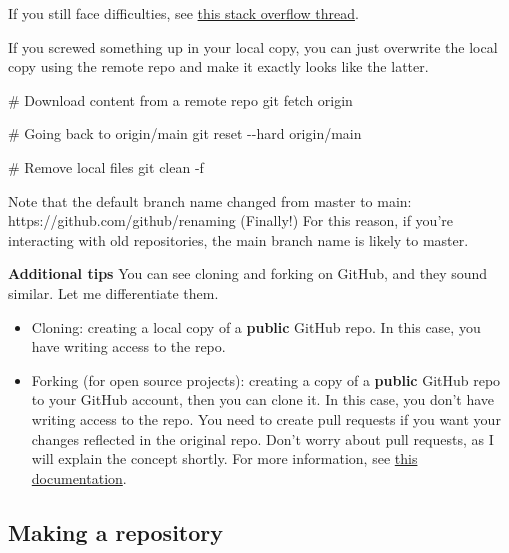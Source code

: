 \documentclass[
  letterpaper,
  DIV=11,
  numbers=noendperiod]{scrreprt}
\newenvironment{Shaded}{\begin{snugshade}}{\end{snugshade}}
\newcommand{\AttributeTok}[1]{\textcolor[rgb]{0.40,0.45,0.13}{#1}}
\newcommand{\CommentTok}[1]{\textcolor[rgb]{0.37,0.37,0.37}{#1}}
\newcommand{\FunctionTok}[1]{\textcolor[rgb]{0.28,0.35,0.67}{#1}}
\newcommand{\NormalTok}[1]{\textcolor[rgb]{0.00,0.23,0.31}{#1}}
\begin{document}
If you still face difficulties, see
\href{https://stackoverflow.com/questions/13509293/git-fatal-could-not-read-from-remote-repository}{this
stack overflow thread}.

If you screwed something up in your local copy, you can just overwrite
the local copy using the remote repo and make it exactly looks like the
latter.

\begin{Shaded}
\begin{Highlighting}[]
\CommentTok{\# Download content from a remote repo }
\FunctionTok{git}\NormalTok{ fetch origin}

\CommentTok{\# Going back to origin/main}
\FunctionTok{git}\NormalTok{ reset }\AttributeTok{{-}{-}hard}\NormalTok{ origin/main }

\CommentTok{\# Remove local files }
\FunctionTok{git}\NormalTok{ clean }\AttributeTok{{-}f}
\end{Highlighting}
\end{Shaded}

Note that the default branch name changed from master to main:
https://github.com/github/renaming (Finally!) For this reason, if you're
interacting with old repositories, the main branch name is likely to
master.

\textbf{Additional tips} You can see cloning and forking on GitHub, and
they sound similar. Let me differentiate them.

\begin{itemize}
\item
  Cloning: creating a local copy of a \textbf{public} GitHub repo. In
  this case, you have writing access to the repo.
\item
  Forking (for open source projects): creating a copy of a
  \textbf{public} GitHub repo to your GitHub account, then you can clone
  it. In this case, you don't have writing access to the repo. You need
  to create pull requests if you want your changes reflected in the
  original repo. Don't worry about pull requests, as I will explain the
  concept shortly. For more information, see
  \href{https://docs.github.com/en/desktop/contributing-and-collaborating-using-github-desktop/cloning-and-forking-repositories-from-github-desktop}{this
  documentation}.
\end{itemize}

\hypertarget{making-a-repository}{%
\subsection*{Making a repository}\label{making-a-repository}}
\end{document}
